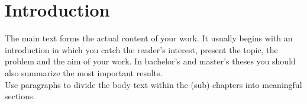 \section{Introduction}
The main text forms the actual content of your work. It usually begins with an introduction in which you catch the reader's interest, present the topic, the problem and the aim of your work. In bachelor’s and master’s theses you should also summarize the most important results.\\
Use paragraphs to divide the body text within the (sub) chapters into meaningful sections.


